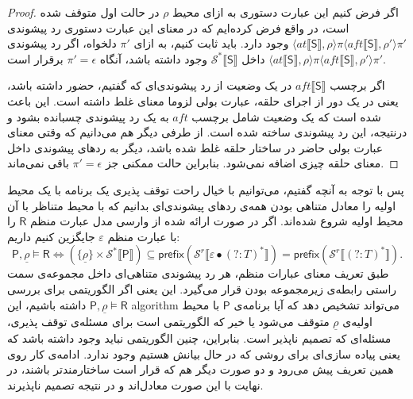 \begin{proof}
اگر فرض کنیم این عبارت‌ دستوری به ازای محیط $\rho$ در حالت اول متوقف شده است، در واقع فرض کرده‌ایم که در معنای این عبارت‌ دستوری رد پیشوندی 
$\langle at \llbracket \mathsf{S} \rrbracket , \rho \rangle \pi \langle aft \llbracket \mathsf{S} \rrbracket , \rho' \rangle \pi'$ 
وجود دارد.
باید ثابت کنیم، به ازای $\pi'$ دلخواه، اگر رد پیشوندی
$\langle at \llbracket \mathsf{S} \rrbracket , \rho \rangle \pi \langle aft \llbracket \mathsf{S} \rrbracket , \rho' \rangle \pi'$ 
داخل 
$\mathcal{S^*}\llbracket \mathsf{S} \rrbracket$
وجود داشته باشد، آنگاه
$\pi'=\epsilon$
برقرار است.

اگر برچسب
$aft \llbracket \mathsf{S} \rrbracket$
در یک وضعیت از رد پیشوندی‌ای که گفتیم، حضور داشته باشد، یعنی در یک دور از اجرای حلقه، عبارت بولی لزوما معنای غلط داشته است. این باعث شده است که یک وضعیت شامل برچسب $aft$ به یک رد پیشوندی چسبانده بشود و درنتیجه، این رد پیشوندی ساخته شده است. از طرفی دیگر هم می‌دانیم که وقتی معنای عبارت بولی حاضر در ساختار حلقه غلط شده باشد، دیگر به ردهای پیشوندی داخل معنای حلقه چیزی اضافه نمی‌شود. بنابراین حالت ممکنی جز $\pi'=\epsilon$ باقی نمی‌ماند. 
\end{proof}

پس با توجه به آنچه گفتیم، می‌توانیم با خیال راحت توقف پذیری یک برنامه با یک محیط اولیه را معادل متناهی بودن همه‌ی ردهای پیشوندی‌ای بدانیم که با محیط متناظر با آن محیط اولیه شروع شده‌اند.
اگر در صورت ارائه شده از وارسی مدل عبارت منظم $\mathsf{R}$ را با عبارت منظم $\varepsilon$ جایگزین کنیم داریم:
$$\mathsf{P},\underline{\rho} \models \mathsf{R}
\Leftrightarrow
(\{\underline{\rho}\}\times \mathcal{S}^* \llbracket \mathsf{P}\rrbracket) \subseteq 
\mathsf{prefix} (\mathcal{S}^r \llbracket \varepsilon \bullet (?:\mathit{T})^*\rrbracket)
=\mathsf{prefix} (\mathcal{S}^r \llbracket (?:\mathit{T})^*\rrbracket).$$
طبق تعریف معنای عبارات منظم، هر رد پیشوندی متناهی‌ای داخل مجموعه‌ی سمت راستی رابطه‌ی زیرمجموعه بودن قرار می‌گیرد. این یعنی اگر الگوریتمی برای بررسی 
$\mathsf{P} , \underline{\rho} \models \mathsf{R} $
داشته باشیم، این \gls*{algorithm} می‌تواند تشخیص دهد که آیا برنامه‌ی $\mathsf{P}$ با محیط اولیه‌ی $\underline{\rho}$ متوقف می‌شود یا خیر که الگوریتمی است برای مسئله‌ی توقف پذیری، مسئله‌ای که تصمیم ناپذیر است. بنابراین، چنین الگوریتمی نباید وجود داشته باشد که یعنی پیاده سازی‌ای برای روشی که در حال بیانش هستیم وجود ندارد. ادامه‌ی کار روی همین تعریف پیش می‌رود و دو صورت دیگر هم که قرار است ساختارمندتر باشند، در نهایت با این صورت معادل‌اند و در نتیجه تصمیم ناپذیرند.













